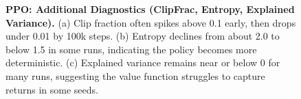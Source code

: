 \begin{figure}[htbp]
	\centering
	\caption{\textbf{PPO: Additional Diagnostics (ClipFrac, Entropy, Explained Variance).}
		(a) Clip fraction often spikes above 0.1 early, then drops under 0.01 by 100k steps.
		(b) Entropy declines from about 2.0 to below 1.5 in some runs, 
		indicating the policy becomes more deterministic.
		(c) Explained variance remains near or below 0 for many runs, 
		suggesting the value function struggles to capture returns in some seeds.}
	\label{fig:ppo_additional_losses}
\end{figure}

